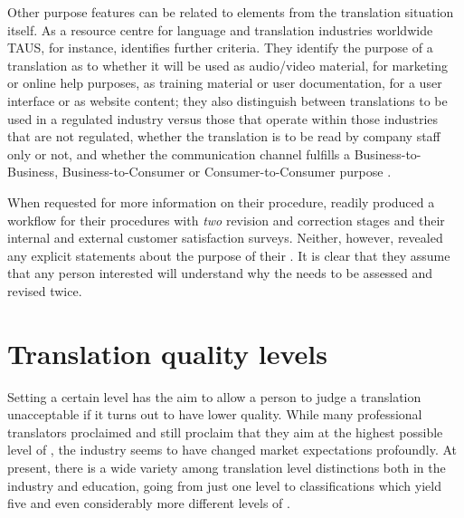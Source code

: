 \documentclass[output=paper]{langsci/langscibook}
\begin{document}
Other purpose features can be related to elements from the translation situation itself. As a resource centre for language and translation industries worldwide TAUS, for instance, identifies further criteria. They identify the purpose of a translation as to whether it will be used as audio/video material, for marketing or online help purposes, as training material or user documentation, for a user interface or as website content; they also distinguish between translations to be used in a regulated industry versus those that operate within those industries that are not regulated, whether the translation is to be read by company staff only or not, and whether the communication channel fulfills a Business-to-Business, Business-to-Consumer or Consumer-to-Consumer purpose \citep{TAUS2013}.

When requested for more information on their  procedure, \citeauthor{SCTAn.d.} readily produced a workflow for their  procedures with \textit{two} revision and correction stages and their internal and external customer satisfaction surveys. Neither, however, revealed any explicit statements about the purpose of their  . It is clear that they assume that any person interested will understand why the  needs to be assessed and revised twice. 

\section{Translation quality levels}\label{sec:vandepitte:3}

Setting a certain  level has the aim to allow a person to judge a translation unacceptable if it turns out to have lower quality. While many professional translators proclaimed and still proclaim that they aim at the highest possible level of , the  industry seems to have changed market expectations profoundly. At present, there is a wide variety among translation level distinctions both in the industry and education, going from just one level to classifications which yield five and even considerably more different levels of .
\end{document}
